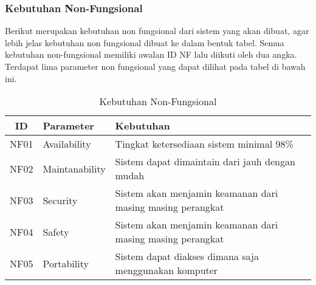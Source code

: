 \subsubsection{Kebutuhan Non-Fungsional}
Berikut merupakan kebutuhan non fungsional dari sistem yang akan dibuat, agar lebih jelas kebutuhan non fungsional dibuat ke dalam bentuk tabel. Semua kebutuhan non-fungsional memiliki awalan ID NF lalu diikuti oleh dua angka. Terdapat lima parameter non fungsional yang dapat dilihat pada tabel di bawah ini.
\begin{table}[h]
  \caption{Kebutuhan Non-Fungsional}
  \label{tab:kebutuhan-non-fungsional}
  \centering
  \begin{tabular}{|c|p{3cm}|p{8cm}|}
    \hline
    ID   & Parameter      & Kebutuhan                                                  \\
    \hline
    NF01 & Availability   & Tingkat ketersediaan sistem minimal 98\%                   \\
    \hline
    NF02 & Maintanability & Sistem dapat dimaintain dari jauh dengan mudah             \\
    \hline
    NF03 & Security       & Sistem akan menjamin keamanan dari masing masing perangkat \\
    \hline
    NF04 & Safety         & Sistem akan menjamin keamanan dari masing masing perangkat \\
    \hline
    NF05 & Portability    & Sistem dapat diakses dimana saja menggunakan komputer      \\
    \hline
  \end{tabular}
\end{table}